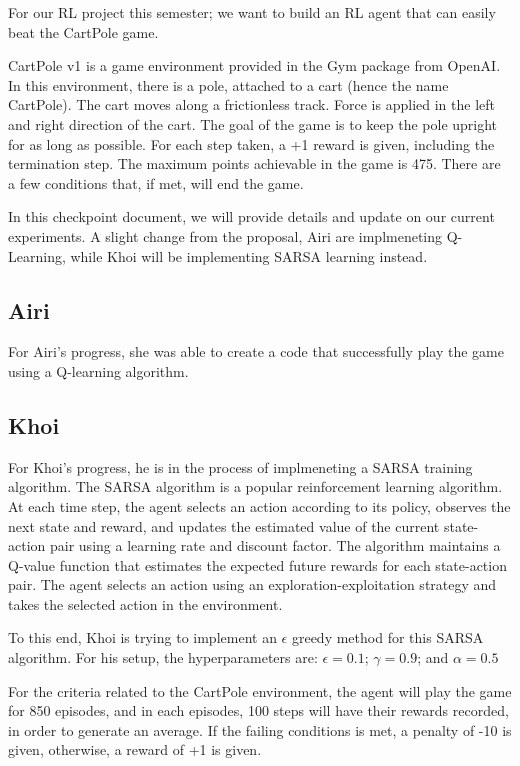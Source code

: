 \documentclass[nohyperref]{article}
\theoremstyle{plain}
\theoremstyle{definition}
\theoremstyle{remark}
\begin{document}

For our RL project this semester; we want to build an RL agent that can easily beat the CartPole game.  

CartPole v1 is a game environment provided in the Gym package from OpenAI. In this environment, there is a pole, attached to a cart (hence the name CartPole). The cart moves along a frictionless track. Force is applied in the left and right direction of the cart.
The goal of the game is to keep the pole upright for as long as possible. For each step taken, a +1 reward is given, including the termination step. The maximum points achievable in the game is 475. There are a few conditions that, if met, will end the game.

In this checkpoint document, we will provide details and update on our current experiments. A slight change from the proposal, Airi are implmeneting Q-Learning, while Khoi will be implementing SARSA learning instead.

\subsection*{Airi}
For Airi's progress, she was able to create a code that successfully play the game using a Q-learning algorithm.

\subsection*{Khoi}
For Khoi's progress, he is in the process of implmeneting a SARSA training algorithm. 
The SARSA algorithm is a popular reinforcement learning algorithm. At each time step, the agent selects an action according to its policy, observes the next state and reward, and updates the estimated value of the current state-action pair using a learning rate and discount factor. 
The algorithm maintains a Q-value function that estimates the expected future rewards for each state-action pair. The agent selects an action using an exploration-exploitation strategy and takes the selected action in the environment.

To this end, Khoi is trying to implement an $\epsilon$ greedy method for this SARSA algorithm. For his setup, the hyperparameters are: $\epsilon = 0.1$; $\gamma = 0.9$; and $\alpha = 0.5$

For the criteria related to the CartPole environment, the agent will play the game for 850 episodes, and in each episodes, 100 steps will have their rewards recorded, in order to generate an average.
If the failing conditions is met, a penalty of -10 is given, otherwise, a reward of +1 is given.
\end{document}
